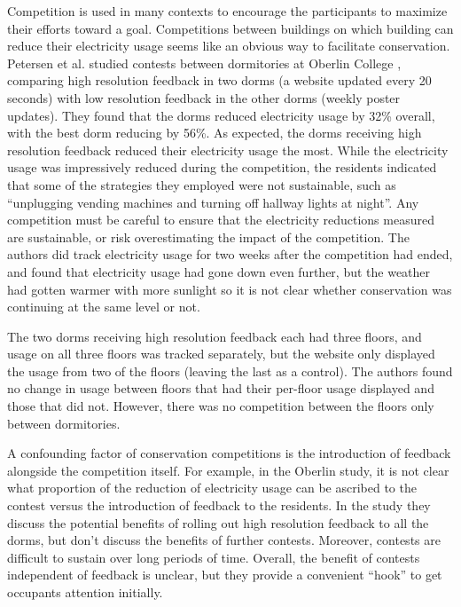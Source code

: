 \documentclass[11pt]{article}
\begin{document}
Competition is used in many contexts to encourage the participants to maximize their efforts toward a goal. Competitions between buildings on which building can reduce their electricity usage seems like an obvious way to facilitate conservation. Petersen et al. studied contests between dormitories at Oberlin College \cite{petersen-dorm-energy-reduction}, comparing high resolution feedback in two dorms (a website updated every 20 seconds) with low resolution feedback in the other dorms (weekly poster updates). They found that the dorms reduced electricity usage by 32\% overall, with the best dorm reducing by 56\%. As expected, the dorms receiving high resolution feedback reduced their electricity usage the most. While the electricity usage was impressively reduced during the competition, the residents indicated that some of the strategies they employed were not sustainable, such as ``unplugging vending machines and turning off hallway lights at night''. Any competition must be careful to ensure that the electricity reductions measured are sustainable, or risk overestimating the impact of the competition. The authors did track electricity usage for two weeks after the competition had ended, and found that electricity usage had gone down even further, but the weather had gotten warmer with more sunlight so it is not clear whether conservation was continuing at the same level or not.

The two dorms receiving high resolution feedback each had three floors, and usage on all three floors was tracked separately, but the website only displayed the usage from two of the floors (leaving the last as a control). The authors found no change in usage between floors that had their per-floor usage displayed and those that did not. However, there was no competition between the floors only between dormitories.

A confounding factor of conservation competitions is the introduction of feedback alongside the competition itself. For example, in the Oberlin study, it is not clear what proportion of the reduction of electricity usage can be ascribed to the contest versus the introduction of feedback to the residents. In the study they discuss the potential benefits of rolling out high resolution feedback to all the dorms, but don't discuss the benefits of further contests. Moreover, contests are difficult to sustain over long periods of time. Overall, the benefit of contests independent of feedback is unclear, but they provide a convenient ``hook'' to get occupants attention initially.
\end{document}
